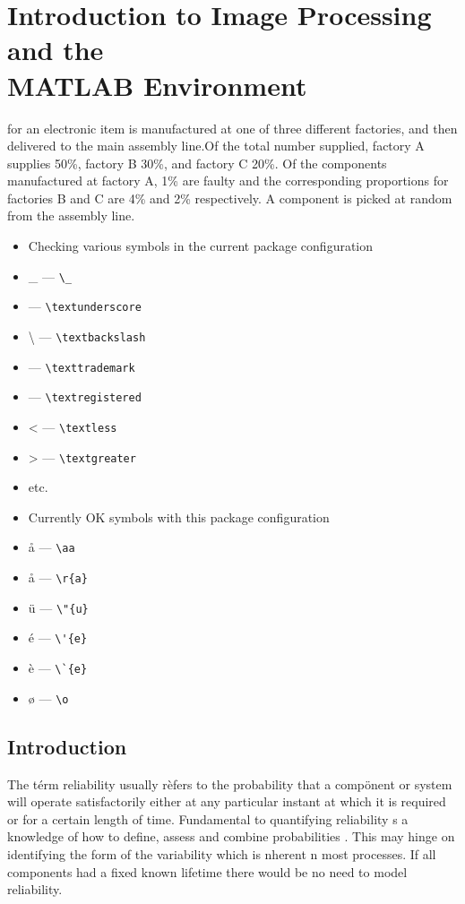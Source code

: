 
\chapter[Introduction to Image Processing and the MATLAB Environment]{Introduction to Image Processing and the\\ MATLAB Environment}


 for an electronic item is
manufactured at one of three different factories, and then delivered to
the main assembly line.Of the total number supplied, factory A supplies
50\%, factory B 30\%, and factory C 20\%. Of the components
manufactured at factory A, 1\% are faulty and the corresponding
proportions for factories B and C are 4\% and 2\% respectively. A
component is picked at random from the assembly line. 

\begin{itemize}

	\item Checking various symbols in the current package configuration
	\item \_ --- \verb|\_|
	\item \textunderscore{} --- \verb|\textunderscore|
	\item \textbackslash{} --- \verb|\textbackslash|
	\item \texttrademark{} --- \verb|\texttrademark|
	\item \textregistered{} --- \verb|\textregistered|
	\item \textless{} --- \verb|\textless|
	\item \textgreater{} --- \verb|\textgreater|
	\item etc.

	\item Currently OK symbols with this package configuration	
	\item \aa{} --- \verb|\aa|
	\item \r{a} --- \verb|\r{a}|
	\item \"{u} --- \verb|\"{u}|
	\item \'{e} --- \verb|\'{e}|
	\item \`{e} --- \verb|\`{e}|
	\item \o{}  --- \verb|\o|
\end{itemize}


\section{Introduction}\label{intro}
The t\'erm reliability usually r\`efers to the probability that a
comp\"onent or system will operate satisfactorily either at any particular
instant at which it is required or for a certain length of
time. Fundamental to quantifying reliability s a knowledge of how to
define, assess and combine probabilities \cite{Bontempi2005Adaptive}. This may hinge on identifying the
form of the variability which is nherent n most processes. If all
components had a fixed known lifetime there would be no need to model
reliability.


